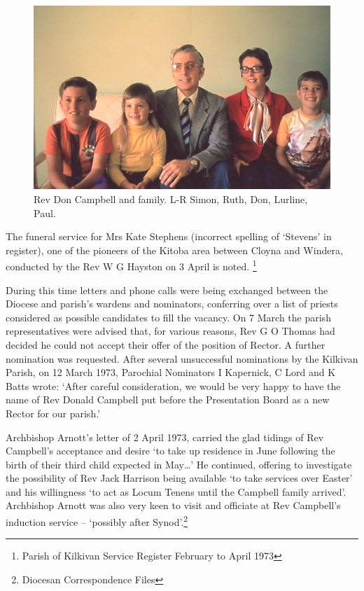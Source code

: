 \begin{figure}
\begin{center}
\includegraphics[width=1.\linewidth,center]{../images/DonCambellAndFamily.png}
\caption{Rev Don Campbell and family. L-R Simon, Ruth, Don, Lurline, Paul.}
\end{center}
\end{figure}




The funeral service for Mrs Kate Stephens (incorrect spelling of `Stevens' in register), one of the pioneers of the Kitoba area between Cloyna and Windera, conducted by the Rev W G Hayston on 3 April is noted. \footnote{Parish of Kilkivan Service Register February to April 1973}


During this time letters and phone calls were being exchanged between the Diocese and parish's wardens and nominators, conferring over a list of priests considered as possible candidates to fill the vacancy. On 7 March the parish representatives were advised that, for various reasons, Rev G O Thomas had decided he could not accept their offer of the position of Rector. A further nomination was requested. After several unsuccessful nominations by the Kilkivan Parish, on 12 March 1973, Parochial Nominators I Kapernick, C Lord and K Batts wrote: `After careful consideration, we would be very happy to have the name of Rev Donald Campbell put before the Presentation Board as a new Rector for our parish.'



Archbishop Arnott's letter of 2 April 1973, carried the glad tidings of Rev Campbell's acceptance and desire `to take up residence in June following the birth of their third child expected in May\ldots' He continued, offering to investigate the possibility of Rev Jack Harrison being available `to take services over Easter' and his willingness `to act as Locum Tenens until the Campbell family arrived'. Archbishop Arnott was also very keen to visit and officiate at Rev Campbell's induction service -- `possibly after Synod'.\footnote{Diocesan Correspondence Files}


